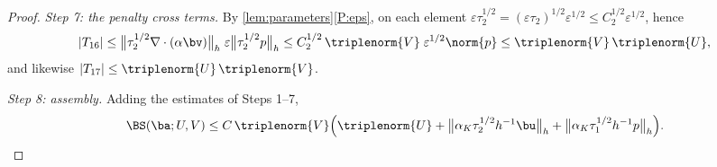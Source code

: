 \begin{proof}
\medskip\noindent\emph{Step 7: the penalty cross terms.}
By \cref{lem:parameters}\ref{P:eps}, on each element
$\varepsilon\tau_2^{1/2}=(\varepsilon\tau_2)^{1/2}\varepsilon^{1/2}
\le C_2^{1/2}\varepsilon^{1/2}$, hence
\begin{equation}\label{eq:crosspenalty}
  |T_{16}|
  \le \bigl\lVert\tau_2^{1/2}\nabla\cdot(\alpha\bv)\bigr\rVert_h\;
  \varepsilon\bigl\lVert\tau_2^{1/2}p\bigr\rVert_h
  \le C_2^{1/2}\,\triplenorm{V}\;\varepsilon^{1/2}\norm{p}
  \le \triplenorm{V}\,\triplenorm{U},
\end{equation}
and likewise $|T_{17}|\le\triplenorm{U}\,\triplenorm{V}$.

\medskip\noindent\emph{Step 8: assembly.}
Adding the estimates of Steps 1--7,
\begin{equation}\label{eq:assembly}
  \BS(\ba;U,V)
  \le C\,\triplenorm{V}\Bigl(\triplenorm{U}
  + \bigl\lVert\alpha_K\tau_2^{1/2}h^{-1}\bu\bigr\rVert_h
  + \bigl\lVert\alpha_K\tau_1^{1/2}h^{-1}p\bigr\rVert_h\Bigr).
\end{equation}


\end{proof}
